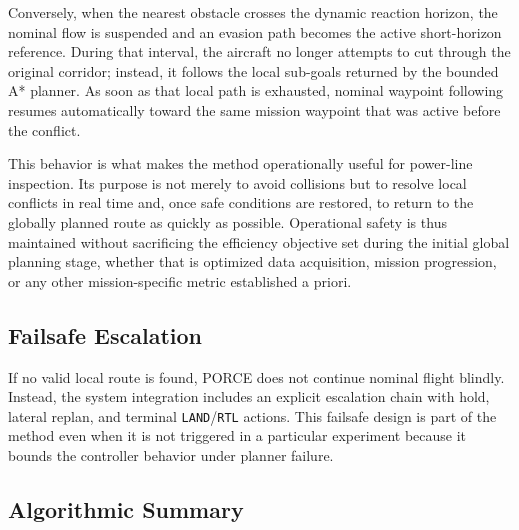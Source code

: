 \documentclass[drones,article,submit,moreauthors]{Definitions/mdpi}
\begin{document}
Conversely, when the nearest obstacle crosses the dynamic reaction horizon, the nominal flow is suspended and an evasion path becomes the active short-horizon reference. During that interval, the aircraft no longer attempts to cut through the original corridor; instead, it follows the local sub-goals returned by the bounded A* planner. As soon as that local path is exhausted, nominal waypoint following resumes automatically toward the same mission waypoint that was active before the conflict.

This behavior is what makes the method operationally useful for power-line inspection. Its purpose is not merely to avoid collisions but to resolve local conflicts in real time and, once safe conditions are restored, to return to the globally planned route as quickly as possible. Operational safety is thus maintained without sacrificing the efficiency objective set during the initial global planning stage, whether that is optimized data acquisition, mission progression, or any other mission-specific metric established a priori.


\subsection{Failsafe Escalation}

If no valid local route is found, PORCE does not continue nominal flight blindly. Instead, the system integration includes an explicit escalation chain with hold, lateral replan, and terminal \texttt{LAND}/\texttt{RTL} actions. This failsafe design is part of the method even when it is not triggered in a particular experiment because it bounds the controller behavior under planner failure.

\subsection{Algorithmic Summary}
\end{document}
